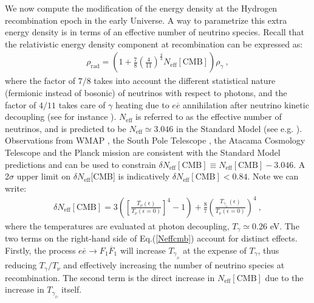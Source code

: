 \documentclass[12pt]{article}
\begin{document}
We now compute the modification of the energy density at the Hydrogen recombination epoch in the early Universe. A way to parametrize this extra energy density is in terms of an effective number of neutrino species. Recall that the relativistic energy density component at recombination can be expressed as:
%
\begin{eqnarray}
\rho _{\text{rad}} = \left (1 + \frac{7}{8} \left (\frac{4}{11} \right) ^{\frac{4}{3}} N _{\text{eff}}[\text{CMB}] \right ) \rho _{\gamma} \ ,
\end{eqnarray}
%
where the factor of $7/8$ takes into account the different statistical nature (fermionic instead of bosonic) of neutrinos with respect to photons, and the factor of $4/11$ takes care of $\gamma$ heating due to $e \overline{e}$ annihilation after neutrino kinetic decoupling (see for instance \cite{earlyuniverse}). $N _{\text{eff}}$ is referred to as the effective number of neutrinos, and is predicted to be $N _{\text{eff}} \simeq 3.046$ in the Standard Model (see e.g. \cite{mangano}). Observations from WMAP \cite{wmapx}, the South Pole Telescope \cite{sptx}, the Atacama Cosmology Telescope \cite{atax} and the Planck mission \cite{plax} are consistent with the Standard Model predictions and can be used to constrain $\delta N _{\text{eff}}[\text{CMB}] \equiv N _{\text{eff}}[\text{CMB}] - 3.046$. A 2$\sigma$ upper limit on $\delta N _{\text{eff}}$[CMB] is indicatively $\delta N _{\text{eff}}[\text{CMB}] < 0.84$. Note we can write:
%
\begin{eqnarray}
\delta N _{\text{eff}}[\text{CMB}] = 3 \left (\left [\frac{T _{\nu} ( \epsilon )}{T _{\nu} ( \epsilon = 0)}\right ]^4 - 1 \right ) + \frac{8}{7} \left ( \frac{T _{\gamma _{_D}} ( \epsilon )}{T _{\nu} ( \epsilon = 0)} \right )^4 \ ,
\label{Neffcmb}
\end{eqnarray}
%
where the temperatures are evaluated at photon decoupling, $T _{\gamma} \simeq 0.26$ eV. The two terms on the right-hand side of Eq.(\ref{Neffcmb}) account for distinct effects. Firstly, the process $e \overline{e} \rightarrow F_1 \overline{F}_1$ will increase $T _{\gamma _{_D}}$ at the expense of $T _{\gamma}$, thus reducing $T _{\gamma}/T _{\nu}$ and effectively increasing the number of neutrino species at recombination. The second term is the direct increase in $N _{\text{eff}}[\text{CMB}]$ due to the increase in $T _{\gamma _{_D}}$ itself.
\end{document}

